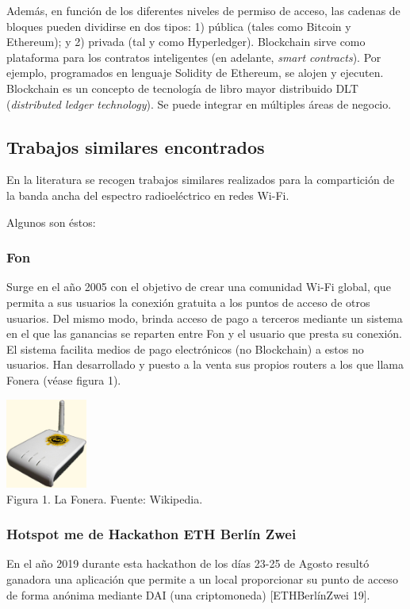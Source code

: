 \documentclass[9pt,oneside]{amsart}
\begin{document}
\begin{multicols}{2}
Además, en función de los diferentes niveles de permiso de acceso, las cadenas de bloques pueden dividirse en dos tipos: 1) pública (tales como Bitcoin y Ethereum); y 2) privada (tal y como Hyperledger). Blockchain sirve como plataforma para los contratos inteligentes (en adelante, \textit{smart contracts}). Por ejemplo, programados en lenguaje Solidity de Ethereum, se alojen y ejecuten. Blockchain es un concepto de tecnología de libro mayor distribuido DLT (\textit{distributed ledger technology}). Se puede integrar en múltiples áreas de negocio.

\subsection{Trabajos similares encontrados} \label{ch:similar}
En la literatura se recogen trabajos similares realizados para la compartición de la banda ancha del espectro radioeléctrico en redes Wi-Fi.

Algunos son éstos:
\subsubsection{Fon} \label{ch:fon}
Surge en el año 2005 con el objetivo de crear una comunidad Wi-Fi global, que permita a sus usuarios la conexión gratuita a los puntos de acceso de otros usuarios. Del mismo modo, brinda acceso de pago a terceros mediante un sistema en el que las ganancias se reparten entre Fon y el
usuario que presta su conexión. El sistema facilita medios de pago electrónicos (no Blockchain) a estos no usuarios. Han desarrollado y puesto a la venta sus propios routers a los que llama Fonera (véase figura 1).
\begin{center}
  \includegraphics[keepaspectratio, width=0.2\textwidth]{images/lafonera-sourcewikipedia.eps}
\\
Figura 1. La Fonera. Fuente: Wikipedia.
\\
\end{center}
\subsubsection{Hotspot me de Hackathon ETH Berlín Zwei} \label{ch:ethberlinzwei}
En el año 2019 durante esta hackathon de los días 23-25 de Agosto resultó ganadora una aplicación que permite a un local proporcionar su punto de acceso de forma anónima mediante DAI (una criptomoneda) [ETHBerlínZwei 19].

\end{multicols}
\end{document}
